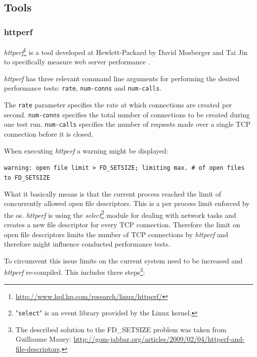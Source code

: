 \subsection{Tools}

\subsubsection{httperf}

\textit{httperf}\footnote{\url{http://www.hpl.hp.com/research/linux/httperf/}} is a tool developed at Hewlett-Packard by David Mosberger and Tai Jin to specifically measure web server performance \cite{httperf}.

\textit{httperf} has three relevant command line arguments for performing the desired performance tests: \texttt{rate}, \texttt{num-conns} and \texttt{num-calls}.

The \texttt{rate} parameter specifies the rate at which connections are created per second. \texttt{num-conns} specifies the total number of connections to be created during one test run. \texttt{num-calls} specifies the number of requests made over a single TCP connection before it is closed.

When executing \textit{httperf} a warning might be displayed:

\texttt{warning: open file limit > FD\_SETSIZE; limiting max. \# of open files to FD\_SETSIZE}

What it basically means is that the current process reached the limit of concurrently allowed open file descriptors. This is a per process limit enforced by the \gls{os}. \textit{httperf} is using the \textit{select}\footnote{"\texttt{select}" is an event library provided by the Linux kernel.} module for dealing with network tasks and creates a new file descriptor for every TCP connection. Therefore the limit on open file descriptors limits the number of TCP connections by \textit{httperf} and therefore might influence conducted performance tests.

To circumvent this issue limits on the current system need to be increased and \textit{httperf} re-compiled. This includes three steps\footnote{The described solution to the FD\_SETSIZE problem was taken from Guillaume Maury: \url{http://gom-jabbar.org/articles/2009/02/04/httperf-and-file-descriptors}.}:

